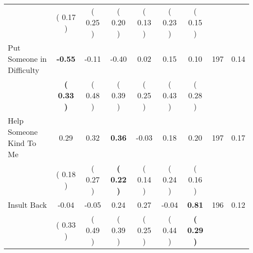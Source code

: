 \begin{tabular}{lcccccccc}
 & (     0.17 ) & (     0.25 ) & (     0.20 ) & (     0.13 ) & (     0.23 ) & (     0.15 ) & \\
Put Someone in Difficulty & \textbf{    -0.55} &     -0.11 &     -0.40 &      0.02 &      0.15 &      0.10 & 197 &       0.14 \\ 
 & \textbf{(     0.33 )} & (     0.48 ) & (     0.39 ) & (     0.25 ) & (     0.43 ) & (     0.28 ) & \\
Help Someone Kind To Me &      0.29 &      0.32 & \textbf{     0.36} &     -0.03 &      0.18 &      0.20 & 197 &       0.17 \\ 
 & (     0.18 ) & (     0.27 ) & \textbf{(     0.22 )} & (     0.14 ) & (     0.24 ) & (     0.16 ) & \\
Insult Back &     -0.04 &     -0.05 &      0.24 &      0.27 &     -0.04 & \textbf{     0.81} & 196 &       0.12 \\ 
 & (     0.33 ) & (     0.49 ) & (     0.39 ) & (     0.25 ) & (     0.44 ) & \textbf{(     0.29 )} & \\
\bottomrule
\end{tabular}

